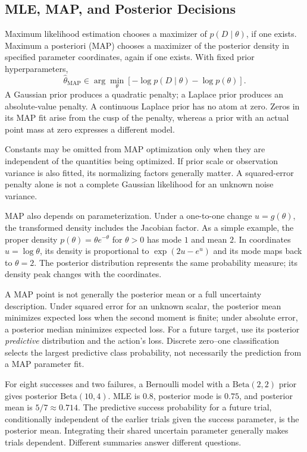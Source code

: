 \subsection{MLE, MAP, and Posterior Decisions}

Maximum likelihood estimation chooses a maximizer of $p(D\mid\theta)$, if one exists. Maximum a posteriori (MAP) chooses a maximizer of the posterior density in specified parameter coordinates, again if one exists. With fixed prior hyperparameters,
\[
\hat\theta_{\mathrm{MAP}}\in\arg\min_\theta
\left[-\log p(D\mid\theta)-\log p(\theta)\right].
\]
A Gaussian prior produces a quadratic penalty; a Laplace prior produces an absolute-value penalty. A continuous Laplace prior has no atom at zero. Zeros in its MAP fit arise from the cusp of the penalty, whereas a prior with an actual point mass at zero expresses a different model.

Constants may be omitted from MAP optimization only when they are independent of the quantities being optimized. If prior scale or observation variance is also fitted, its normalizing factors generally matter. A squared-error penalty alone is not a complete Gaussian likelihood for an unknown noise variance.

MAP also depends on parameterization. Under a one-to-one change $u=g(\theta)$, the transformed density includes the Jacobian factor. As a simple example, the proper density $p(\theta)=\theta e^{-\theta}$ for $\theta>0$ has mode $1$ and mean $2$. In coordinates $u=\log\theta$, its density is proportional to $\exp(2u-e^u)$ and its mode maps back to $\theta=2$. The posterior distribution represents the same probability measure; its density peak changes with the coordinates.

A MAP point is not generally the posterior mean or a full uncertainty description. Under squared error for an unknown scalar, the posterior mean minimizes expected loss when the second moment is finite; under absolute error, a posterior median minimizes expected loss. For a future target, use its posterior \emph{predictive} distribution and the action's loss. Discrete zero--one classification selects the largest predictive class probability, not necessarily the prediction from a MAP parameter fit.

For eight successes and two failures, a Bernoulli model with a $\mathrm{Beta}(2,2)$ prior gives posterior $\mathrm{Beta}(10,4)$. MLE is $0.8$, posterior mode is $0.75$, and posterior mean is $5/7\approx0.714$. The predictive success probability for a future trial, conditionally independent of the earlier trials given the success parameter, is the posterior mean. Integrating their shared uncertain parameter generally makes trials dependent. Different summaries answer different questions.

